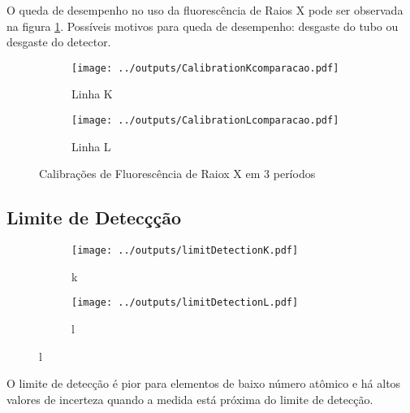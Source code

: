 %  

%  

O queda de desempenho no uso da fluorescência de Raios X pode ser observada 
na figura \ref{fig:compara_calibracao}. 
Possíveis motivos para queda de desempenho: desgaste do tubo ou desgaste do detector. 

\begin{figure}[H]
  \begin{subfigure}[b]{0.5\textwidth}
    \texttt{[image: ../outputs/CalibrationKcomparacao.pdf]}
    \caption{Linha K}
  \end{subfigure}%
  \begin{subfigure}[b]{0.5\textwidth}
    \texttt{[image: ../outputs/CalibrationLcomparacao.pdf]}
    \caption{Linha L}
  \end{subfigure}
  \caption{Calibrações de Fluorescência de Raiox X em 3 períodos \label{fig:compara_calibracao}}
\end{figure}

\subsection{Limite de Detecçção}

\begin{figure}[H]
  \caption{}
  \begin{subfigure}[b]{0.5\textwidth}
    \texttt{[image: ../outputs/limitDetectionK.pdf]}
    \caption{k}
  \end{subfigure}%
  \begin{subfigure}[b]{0.5\textwidth}
    \texttt{[image: ../outputs/limitDetectionL.pdf]}
    \caption{l}
  \end{subfigure}
\end{figure}

O limite de detecção é pior para elementos de baixo número atômico e há
altos valores de incerteza quando a medida está próxima do limite de detecção.
